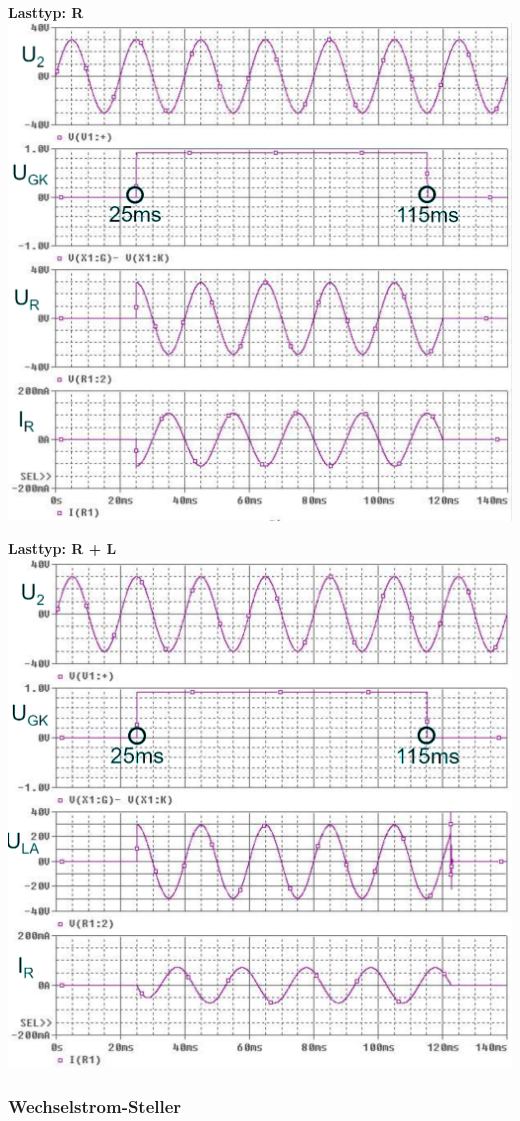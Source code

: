 \begin{minipage}{0.3\linewidth}
    \textbf{Lasttyp: R}\newline
    \includegraphics[width=\linewidth]{images/KLWSSchalter}
\end{minipage}
\begin{minipage}{0.3\linewidth}
    \textbf{Lasttyp: R + L}\newline
    \includegraphics[width=\linewidth]{images/KLWSSchalter2}
\end{minipage}






\subsubsection{Wechselstrom-Steller}


\clearpage